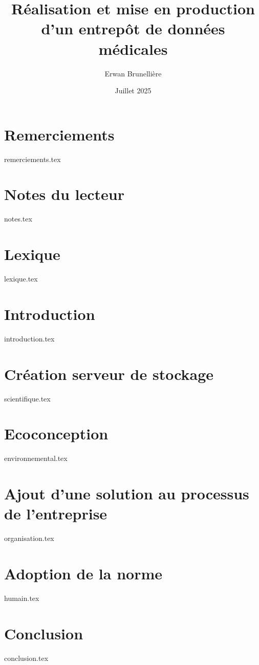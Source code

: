 \documentclass[11pt]{memoireStyle}
\title{Réalisation et mise en production d'un entrepôt de données médicales}
\author{Erwan Brunellière}
\affil{IDIA 2025}
\affil{Polytech Nantes}
\date{Juillet 2025}
\begin{document}
\frontPage

\setStyle

\chapter*{Remerciements}
{remerciements.tex}

\chapter*{Notes du lecteur}
{notes.tex}

\chapter*{Lexique}
{lexique.tex}


\chapter{Introduction}
{introduction.tex}

\chapter{Création serveur de stockage}
{scientifique.tex}

\chapter{Ecoconception}
{environnemental.tex}

\chapter{Ajout d'une solution au processus de l'entreprise}
{organisation.tex}

\chapter{Adoption de la norme}
{humain.tex}

\chapter{Conclusion}
{conclusion.tex}
\end{document}
